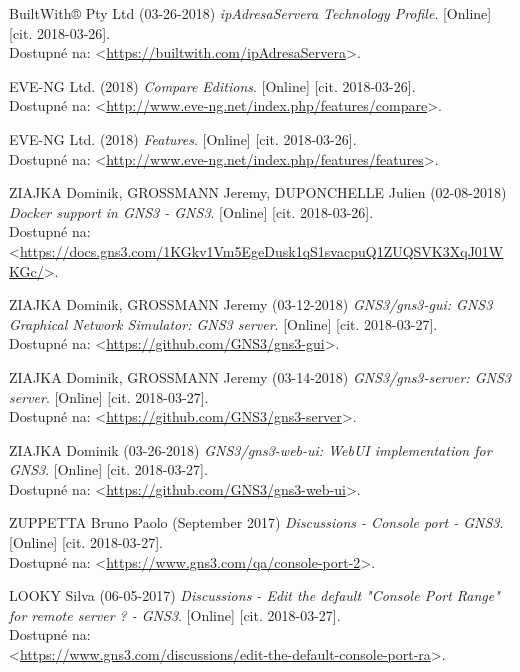 \begin{thebibliography}{99}
BuiltWith® Pty Ltd (03-26-2018) {\it ipAdresaServera Technology Profile}. [Online] [cit. 2018-03-26]. \\
Dostupné na: <\url{https://builtwith.com/ipAdresaServera}>.

EVE-NG Ltd. (2018) {\it Compare Editions}. [Online] [cit. 2018-03-26]. \\
Dostupné na: <\url{http://www.eve-ng.net/index.php/features/compare}>.

EVE-NG Ltd. (2018) {\it Features}. [Online] [cit. 2018-03-26]. \\
Dostupné na: <\url{http://www.eve-ng.net/index.php/features/features}>.

ZIAJKA Dominik, GROSSMANN Jeremy, DUPONCHELLE Julien (02-08-2018) {\it Docker support in GNS3 - GNS3}. [Online] [cit. 2018-03-26]. \\
Dostupné na: \\
<\url{https://docs.gns3.com/1KGkv1Vm5EgeDusk1qS1svacpuQ1ZUQSVK3XqJ01WKGc/}>.

ZIAJKA Dominik, GROSSMANN Jeremy (03-12-2018) {\it GNS3/gns3-gui: GNS3 Graphical Network Simulator: GNS3 server}. [Online] [cit. 2018-03-27]. \\
Dostupné na: <\url{https://github.com/GNS3/gns3-gui}>.

ZIAJKA Dominik, GROSSMANN Jeremy (03-14-2018) {\it GNS3/gns3-server: GNS3 server}. [Online] [cit. 2018-03-27]. \\
Dostupné na: <\url{https://github.com/GNS3/gns3-server}>.

ZIAJKA Dominik (03-26-2018) {\it GNS3/gns3-web-ui: WebUI implementation for GNS3}. [Online] [cit. 2018-03-27]. \\
Dostupné na: <\url{https://github.com/GNS3/gns3-web-ui}>.

ZUPPETTA Bruno Paolo (September 2017) {\it Discussions - Console port - GNS3}. [Online] [cit. 2018-03-27]. \\
Dostupné na: <\url{https://www.gns3.com/qa/console-port-2}>.

LOOKY Silva (06-05-2017) {\it Discussions - Edit the default "Console Port Range" for remote server ? - GNS3}. [Online] [cit. 2018-03-27]. \\
Dostupné na: \\
<\url{https://www.gns3.com/discussions/edit-the-default-console-port-ra}>.


\end{thebibliography}
